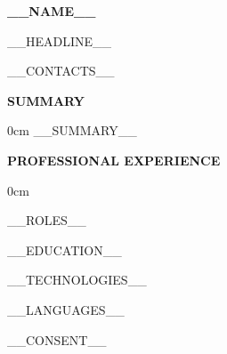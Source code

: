 \documentclass[11pt,a4paper]{article}
\newlength{\cvSectionBefore}  \setlength{\cvSectionBefore}{14pt}
\newlength{\cvSectionAfter}   \setlength{\cvSectionAfter}{6pt}
\newcommand{\cvsectionheading}[1]{%
  {\color{accent}\fontsize{12.5pt}{15pt}\selectfont\bfseries\MakeUppercase{#1}\par}%
  \nobreak\vspace{2pt}%
  \nobreak\vspace{\cvSectionAfter}\nobreak
  \global\cvfirstroletrue
}
\newcommand{\cvsection}[1]{%
  \par\vspace{\cvSectionBefore}%
  \cvsectionheading{#1}%
}
\newif\ifcvfirstrole
\begin{document}
{\color{accent}\fontsize{26pt}{30pt}\selectfont\bfseries __NAME__\par}
\vspace{3pt}
{\fontsize{13pt}{16pt}\selectfont\color{muted} __HEADLINE__\par}
\vspace{8pt}
{\small
  __CONTACTS__
  \par}

\cvsection{Summary}
\begin{addmargin}[0.5cm]{0cm}
__SUMMARY__
\end{addmargin} \par

\cvsection{Professional Experience}
\begin{addmargin}[0.5cm]{0cm}

__ROLES__

\end{addmargin}

__EDUCATION__

__TECHNOLOGIES__

__LANGUAGES__

__CONSENT__
\end{document}
